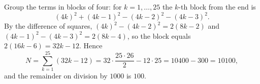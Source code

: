 Group the terms in blocks of four: for $k=1,\dots,25$ the $k$-th block from the end is
\[
(4k)^2+(4k-1)^2-(4k-2)^2-(4k-3)^2 .
\]
By the difference of squares, $(4k)^2-(4k-2)^2=2(8k-2)$ and $(4k-1)^2-(4k-3)^2=2(8k-4)$, so the block equals $2(16k-6)=32k-12$. Hence
\[
N=\sum_{k=1}^{25}(32k-12)=32\cdot\dfrac{25\cdot26}{2}-12\cdot25=10400-300=10100 ,
\]
and the remainder on division by $1000$ is $\boxed{100}$.
